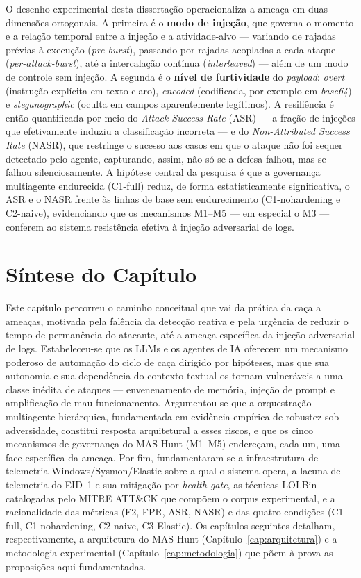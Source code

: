 O desenho experimental desta dissertação operacionaliza a ameaça em duas dimensões ortogonais. A primeira é o \textbf{modo de injeção}, que governa o momento e a relação temporal entre a injeção e a atividade-alvo — variando de rajadas prévias à execução (\textit{pre-burst}), passando por rajadas acopladas a cada ataque (\textit{per-attack-burst}), até a intercalação contínua (\textit{interleaved}) — além de um modo de controle sem injeção. A segunda é o \textbf{nível de furtividade} do \textit{payload}: \textit{overt} (instrução explícita em texto claro), \textit{encoded} (codificada, por exemplo em \textit{base64}) e \textit{steganographic} (oculta em campos aparentemente legítimos). A resiliência é então quantificada por meio do \textit{Attack Success Rate} (ASR) — a fração de injeções que efetivamente induziu a classificação incorreta — e do \textit{Non-Attributed Success Rate} (NASR), que restringe o sucesso aos casos em que o ataque não foi sequer detectado pelo agente, capturando, assim, não só se a defesa falhou, mas se falhou silenciosamente. A hipótese central da pesquisa é que a governança multiagente endurecida (C1-full) reduz, de forma estatisticamente significativa, o ASR e o NASR frente às linhas de base sem endurecimento (C1-nohardening e C2-naive), evidenciando que os mecanismos M1–M5 — em especial o M3 — conferem ao sistema resistência efetiva à injeção adversarial de logs.

\section{Síntese do Capítulo}
\label{sec:sintese}

Este capítulo percorreu o caminho conceitual que vai da prática da caça a ameaças, motivada pela falência da detecção reativa e pela urgência de reduzir o tempo de permanência do atacante, até a ameaça específica da injeção adversarial de logs. Estabeleceu-se que os LLMs e os agentes de IA oferecem um mecanismo poderoso de automação do ciclo de caça dirigido por hipóteses, mas que sua autonomia e sua dependência do contexto textual os tornam vulneráveis a uma classe inédita de ataques — envenenamento de memória, injeção de prompt e amplificação de mau funcionamento. Argumentou-se que a orquestração multiagente hierárquica, fundamentada em evidência empírica de robustez sob adversidade, constitui resposta arquitetural a esses riscos, e que os cinco mecanismos de governança do MAS-Hunt (M1–M5) endereçam, cada um, uma face específica da ameaça. Por fim, fundamentaram-se a infraestrutura de telemetria Windows/Sysmon/Elastic sobre a qual o sistema opera, a lacuna de telemetria do EID~1 e sua mitigação por \textit{health-gate}, as técnicas LOLBin catalogadas pelo MITRE ATT\&CK que compõem o corpus experimental, e a racionalidade das métricas (F2, FPR, ASR, NASR) e das quatro condições (C1-full, C1-nohardening, C2-naive, C3-Elastic). Os capítulos seguintes detalham, respectivamente, a arquitetura do MAS-Hunt (Capítulo~\ref{cap:arquitetura}) e a metodologia experimental (Capítulo~\ref{cap:metodologia}) que põem à prova as proposições aqui fundamentadas.
